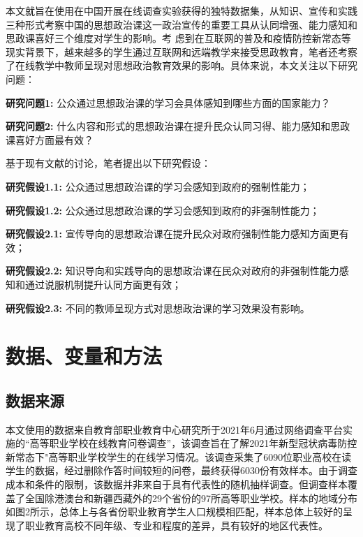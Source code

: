\documentclass[
  12pt,
]{ctexart}
\begin{document}
本文就旨在使用在中国开展在线调查实验获得的独特数据集，从知识、宣传和实践三种形式考察中国的思想政治课这一政治宣传的重要工具从认同增强、能力感知和思政课喜好三个维度对学生的影响。考
虑到在互联网的普及和疫情防控新常态等现实背景下，越来越多的学生通过互联网和远端教学来接受思政教育，笔者还考察了在线教学中教师呈现对思想政治教育效果的影响。具体来说，本文关注以下研究问题：

\textbf{研究问题1:} 公众通过思想政治课的学习会具体感知到哪些方面的国家能力？

\textbf{研究问题2:} 什么内容和形式的思想政治课在提升民众认同习得、能力感知和思政课喜好方面最有效？

基于现有文献的讨论，笔者提出以下研究假设：

\textbf{研究假设1.1:} 公众通过思想政治课的学习会感知到政府的强制性能力；

\textbf{研究假设1.2:} 公众通过思想政治课的学习会感知到政府的非强制性能力；

\textbf{研究假设2.1:} 宣传导向的思想政治课在提升民众对政府强制性能力感知方面更有效；

\textbf{研究假设2.2:} 知识导向和实践导向的思想政治课在民众对政府的非强制性能力感知和通过说服机制提升认同方面更有效；

\textbf{研究假设2.3:} 不同的教师呈现方式对思想政治课的学习效果没有影响。

\hypertarget{ux6570ux636eux53d8ux91cfux548cux65b9ux6cd5}{%
\section{数据、变量和方法}\label{ux6570ux636eux53d8ux91cfux548cux65b9ux6cd5}}

\hypertarget{ux6570ux636eux6765ux6e90}{%
\subsection{数据来源}\label{ux6570ux636eux6765ux6e90}}

本文使用的数据来自教育部职业教育中心研究所于2021年6月通过网络调查平台实施的``高等职业学校在线教育问卷调查''，该调查旨在了解2021年新型冠状病毒防控新常态下"高等职业学校学生的在线学习情况。该调查采集了6090位职业高校在读学生的数据，经过删除作答时间较短的问卷，最终获得6030份有效样本。由于调查成本和条件的限制，该数据并非来自于具有代表性的随机抽样调查。但调查样本覆盖了全国除港澳台和新疆西藏外的29个省份的97所高等职业学校。样本的地域分布如图2所示，总体上与各省份职业教育学生人口规模相匹配，样本总体上较好的呈现了职业教育高校不同年级、专业和程度的差异，具有较好的地区代表性。
\end{document}
